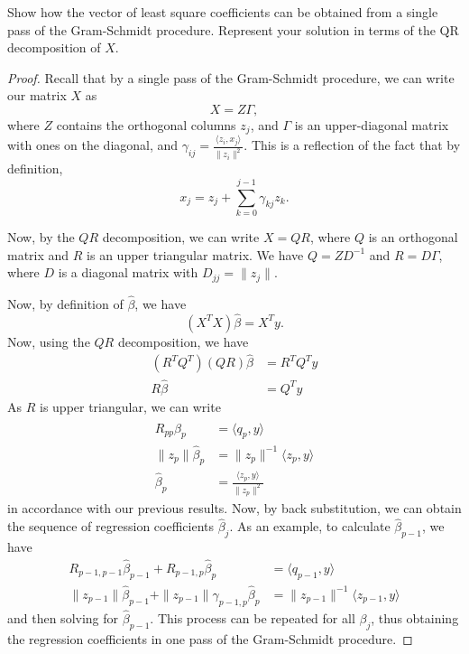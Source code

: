 \begin{exer}
    Show how the vector of least square coefficients can be obtained from a single pass of the Gram-Schmidt procedure.  Represent your solution in terms of the QR decomposition of $X$.  
\end{exer}

\begin{proof}
    Recall that by a single pass of the Gram-Schmidt procedure, we can write our matrix $X$ as \[
        X = Z \Gamma,
        \] where $Z$ contains the orthogonal columns $z_j$, and $\Gamma$ is an upper-diagonal matrix with ones on the diagonal, and $\gamma_{ij} = \frac{\langle z_i, x_j \rangle}{\| z_i \|^2}$. This is a reflection of the fact that by definition, \[
            x_j = z_j + \sum_{k=0}^{j-1} \gamma_{kj} z_k.
            \]

            Now, by the $QR$ decomposition, we can write $X = QR$, where $Q$ is an orthogonal matrix and $R$ is an upper triangular matrix.  We have $Q = Z D^{-1}$ and $R = D\Gamma$, where $D$ is a diagonal matrix  with $D_{jj} = \| z_j \|$.  

    Now, by definition of $\hat \beta$, we have \[
        (X^T X) \hat \beta = X^T y.
        \]  Now, using the $QR$ decomposition, we have \begin{align*}
            (R^T Q^T) (QR) \hat \beta &= R^T Q^T y \\
            R \hat \beta &= Q^T y
        \end{align*}
    As $R$ is upper triangular, we can write \begin{align*}
        R_{pp} \hat \beta_p &= \langle q_p, y \rangle \\
        \| z_p \| \hat \beta_p &= \| z_p \|^{-1} \langle z_p, y \rangle \\
        \hat \beta_p &= \frac{\langle z_p, y \rangle}{\| z_p \|^2}
    \end{align*} in accordance with our previous results.  Now, by back substitution, we can obtain the sequence of regression coefficients $\hat \beta_j$.  As an example, to calculate $\hat \beta_{p-1}$, we have \begin{align*}
        R_{p-1, p-1} \hat \beta_{p-1} + R_{p-1,p} \hat \beta_p &= \langle q_{p-1}, y \rangle \\
        \| z_{p-1} \| \hat \beta_{p-1} + \| z_{p-1} \| \gamma_{p-1,p} \hat \beta_p &= \| z_{p-1} \|^{-1} \langle z_{p-1}, y \rangle 
    \end{align*} and then solving for $\hat \beta_{p-1}$. This process can be repeated for all $\beta_j$, thus obtaining the regression coefficients in one pass of the Gram-Schmidt procedure.
\end{proof}


